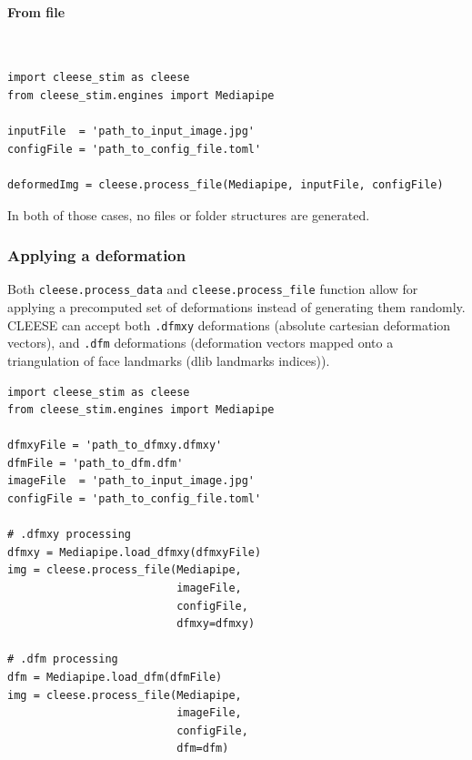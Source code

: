 \documentclass[oneside,10pt]{article}
\begin{document}
\paragraph*{From file}~\\

\vspace{8pt}
\begin{verbatim}
import cleese_stim as cleese
from cleese_stim.engines import Mediapipe

inputFile  = 'path_to_input_image.jpg'
configFile = 'path_to_config_file.toml'

deformedImg = cleese.process_file(Mediapipe, inputFile, configFile)
\end{verbatim}
\vspace{8pt}

In both of those cases, no files or folder structures are generated.

\subsubsection{Applying a deformation}

Both \texttt{cleese.process\_data} and \texttt{cleese.process\_file} function
allow for applying a precomputed set of deformations instead of generating them
randomly. CLEESE can accept both \texttt{.dfmxy} deformations (absolute
cartesian deformation vectors), and \texttt{.dfm} deformations (deformation
vectors mapped onto a triangulation of face landmarks (dlib landmarks
indices)).

\vspace{8pt}
\begin{verbatim}
import cleese_stim as cleese
from cleese_stim.engines import Mediapipe

dfmxyFile = 'path_to_dfmxy.dfmxy'
dfmFile = 'path_to_dfm.dfm'
imageFile  = 'path_to_input_image.jpg'
configFile = 'path_to_config_file.toml'

# .dfmxy processing
dfmxy = Mediapipe.load_dfmxy(dfmxyFile)
img = cleese.process_file(Mediapipe,
                          imageFile,
                          configFile,
                          dfmxy=dfmxy)

# .dfm processing
dfm = Mediapipe.load_dfm(dfmFile)
img = cleese.process_file(Mediapipe,
                          imageFile,
                          configFile,
                          dfm=dfm)
\end{verbatim}
\vspace{8pt}
\end{document}
